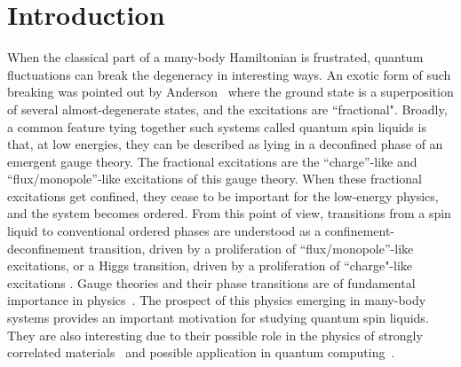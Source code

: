 \documentclass[twocolumn,superscriptaddress,amsmath,amssymb,aps,prx,nofootinbib]{revtex4-2}
\begin{document}
\maketitle

\section{Introduction}
When the classical part of a many-body Hamiltonian is frustrated, quantum fluctuations can break the degeneracy in interesting ways. An exotic form of such breaking was pointed out by Anderson~\cite{anderson1973resonating} where the ground state is a  superposition of several almost-degenerate states, and the excitations are ``fractional"\cite{savary2017}. Broadly, a common feature tying together such systems called quantum spin liquids is that, at low energies, they can be described as lying in a deconfined phase of an emergent gauge theory. The fractional excitations are the ``charge''-like and ``flux/monopole''-like excitations of this gauge theory. When these fractional excitations get confined, they cease to be important for the low-energy physics, and the system becomes ordered.  From this point of view, transitions from a spin liquid to conventional ordered phases are understood as a confinement-deconfinement transition, driven by a proliferation of ``flux/monopole''-like excitations, or a Higgs transition, driven by a proliferation of ``charge"-like excitations \cite{senthil2004deconfined,hermele2005algebraic,song2019unifying,nambiar2022monopole, chen2017symmetry, nussinov2007high}. Gauge theories and their phase transitions are of fundamental importance in physics~\cite{marciano1978quantum,meyer1996phase,kogut1983lattice,o2000gauge}. The prospect of this physics emerging in many-body systems provides an important motivation for studying quantum spin liquids. They are also interesting due to their possible role in the physics of strongly correlated materials~\cite{lee2006doping} and possible application in quantum computing~\cite{kitaev2003fault,nayak2008non}. 
\end{document}

